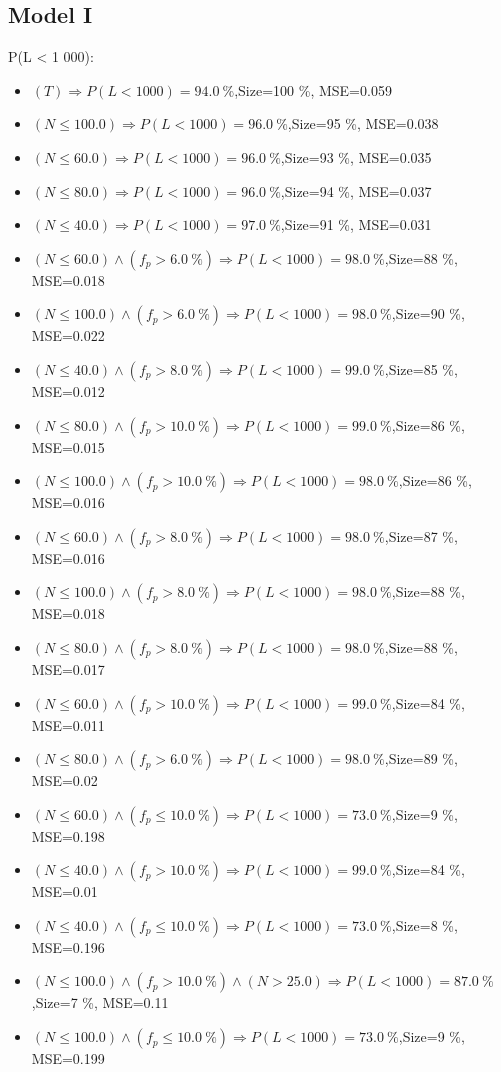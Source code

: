 \documentclass[numbered]{CSL}
\begin{document}
\subsection{Model I}
P(L < 1 000):
\begin{itemize}
\item $(T) \Rightarrow P(L < 1 000) = 94.0~\%$,\hfill Size=100 \%, MSE=0.059
\item $(N \leq 100.0) \Rightarrow P(L < 1 000) = 96.0~\%$,\hfill Size=95 \%, MSE=0.038
\item $(N \leq 60.0) \Rightarrow P(L < 1 000) = 96.0~\%$,\hfill Size=93 \%, MSE=0.035
\item $(N \leq 80.0) \Rightarrow P(L < 1 000) = 96.0~\%$,\hfill Size=94 \%, MSE=0.037
\item $(N \leq 40.0) \Rightarrow P(L < 1 000) = 97.0~\%$,\hfill Size=91 \%, MSE=0.031
\item $(N \leq 60.0) \land (f_p > 6.0~\%) \Rightarrow P(L < 1 000) = 98.0~\%$,\hfill Size=88 \%, MSE=0.018
\item $(N \leq 100.0) \land (f_p > 6.0~\%) \Rightarrow P(L < 1 000) = 98.0~\%$,\hfill Size=90 \%, MSE=0.022
\item $(N \leq 40.0) \land (f_p > 8.0~\%) \Rightarrow P(L < 1 000) = 99.0~\%$,\hfill Size=85 \%, MSE=0.012
\item $(N \leq 80.0) \land (f_p > 10.0~\%) \Rightarrow P(L < 1 000) = 99.0~\%$,\hfill Size=86 \%, MSE=0.015
\item $(N \leq 100.0) \land (f_p > 10.0~\%) \Rightarrow P(L < 1 000) = 98.0~\%$,\hfill Size=86 \%, MSE=0.016
\item $(N \leq 60.0) \land (f_p > 8.0~\%) \Rightarrow P(L < 1 000) = 98.0~\%$,\hfill Size=87 \%, MSE=0.016
\item $(N \leq 100.0) \land (f_p > 8.0~\%) \Rightarrow P(L < 1 000) = 98.0~\%$,\hfill Size=88 \%, MSE=0.018
\item $(N \leq 80.0) \land (f_p > 8.0~\%) \Rightarrow P(L < 1 000) = 98.0~\%$,\hfill Size=88 \%, MSE=0.017
\item $(N \leq 60.0) \land (f_p > 10.0~\%) \Rightarrow P(L < 1 000) = 99.0~\%$,\hfill Size=84 \%, MSE=0.011
\item $(N \leq 80.0) \land (f_p > 6.0~\%) \Rightarrow P(L < 1 000) = 98.0~\%$,\hfill Size=89 \%, MSE=0.02
\item $(N \leq 60.0) \land (f_p \leq 10.0~\%) \Rightarrow P(L < 1 000) = 73.0~\%$,\hfill Size=9 \%, MSE=0.198
\item $(N \leq 40.0) \land (f_p > 10.0~\%) \Rightarrow P(L < 1 000) = 99.0~\%$,\hfill Size=84 \%, MSE=0.01
\item $(N \leq 40.0) \land (f_p \leq 10.0~\%) \Rightarrow P(L < 1 000) = 73.0~\%$,\hfill Size=8 \%, MSE=0.196
\item $(N \leq 100.0) \land (f_p > 10.0~\%) \land (N > 25.0) \Rightarrow P(L < 1 000) = 87.0~\%$,\hfill Size=7 \%, MSE=0.11
\item $(N \leq 100.0) \land (f_p \leq 10.0~\%) \Rightarrow P(L < 1 000) = 73.0~\%$,\hfill Size=9 \%, MSE=0.199
\end{itemize}
\end{document}
